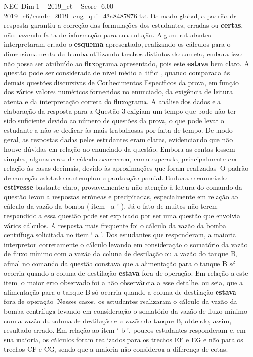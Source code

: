 \begin{textsample}{NEG Dim 1 – 2019\_c6 – Score -6.00 – 2019\_c6/enade\_2019\_eng\_qui\_42a8487876.txt}
De modo global, o padrão de resposta garantiu a correção das formulações dos estudantes, erradas ou \textbf{certas}, não havendo falta de informação para sua solução.
Alguns estudantes interpretaram errado o \textbf{esquema} apresentado, realizando os cálculos para o dimensionamento da bomba utilizando trechos distintos do correto, embora isso não possa ser atribuído ao fluxograma apresentado, pois este \textbf{estava} bem claro.
A questão pode ser considerada de nível médio a difícil, quando comparada às demais questões discursivas de Conhecimentos Específicos da prova, em função dos vários valores numéricos fornecidos no enunciado, da exigência de leitura atenta e da interpretação correta do fluxograma.
A análise dos dados e a elaboração da resposta para a Questão 3 exigiam um tempo que pode não ter sido suficiente devido ao número de questões da prova, o que pode levar o estudante a não se dedicar às mais trabalhosas por falta de tempo.
De modo geral, as respostas dadas pelos estudantes eram claras, evidenciando que não houve dúvidas em relação ao enunciado da questão.
Embora as contas fossem simples, alguns erros de cálculo ocorreram, como esperado, principalmente em relação às casas decimais, devido às aproximações que foram realizadas.
O padrão de correção adotado contemplou a pontuação parcial.
Embora o enunciado \textbf{estivesse} bastante claro, provavelmente a não atenção à leitura do comando da questão levou a respostas errôneas e precipitadas, especialmente em relação ao cálculo da vazão da bomba ( item ‘ a ’ ).
Já o fato de muitos não terem respondido a essa questão pode ser explicado por ser uma questão que envolvia vários cálculos.
A resposta mais frequente foi o cálculo da vazão da bomba centrífuga solicitada no item ‘ a ’.
Dos estudantes que responderam, a maioria interpretou corretamente o cálculo levando em consideração o somatório da vazão de fluxo mínimo com a vazão da coluna de destilação ou a vazão do tanque B, afinal no comando da questão constava que a alimentação para o tanque B só ocorria quando a coluna de destilação \textbf{estava} fora de operação.
Em relação a este item, o maior erro observado foi a não observância a esse detalhe, ou seja, que a alimentação para o tanque B só ocorria quando a coluna de destilação \textbf{estava} fora de operação.
Nesses casos, os estudantes realizaram o cálculo da vazão da bomba centrífuga levando em consideração o somatório da vazão de fluxo mínimo com a vazão da coluna de destilação e a vazão do tanque B, obtendo, assim, resultado errado.
Em relação ao item ‘ b ’, poucos estudantes responderam e, em sua maioria, os cálculos foram realizados para os trechos EF e EG e não para os trechos CF e CG, sendo que a maioria não considerou a diferença de cotas.

\end{textsample}
